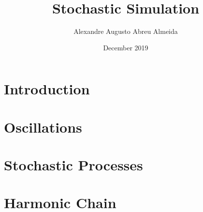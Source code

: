 \documentclass{article} %
\title{Stochastic Simulation}
\author{Alexandre Augusto Abreu Almeida}
\date{December 2019}
\begin{document}
\maketitle

\section{Introduction}
%

\section{Oscillations}
%

\section{Stochastic Processes}
%

\section{Harmonic Chain}
%

\nocite{*}


\end{document}
